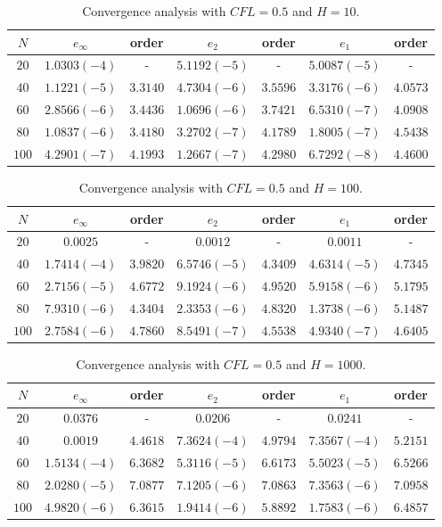 \documentclass[10pt,a4paper]{amsart}
\begin{document}
\begin{table}[H!]
\begin{tabular}{c|c|c|c|c|c|c}
$N$ & $e_{\infty}$ & order & $e_2$ & order & $e_1$ & order \\ 
\hline 
\hline
$20$ & $1.0303 (-4)$ & - & $5.1192 (-5)$ & - & $5.0087 (-5)$ & - \\ 
\hline 
$40$ & $1.1221 (-5)$ & $3.3140$ & $4.7304 (-6)$ & $3.5596$ & $3.3176 (-6)$ & $4.0573$ \\ 
\hline 
$60$ & $2.8566 (-6)$ & $3.4436$ & $1.0696 (-6)$ & $3.7421$ & $6.5310 (-7)$ & $4.0908$ \\
\hline 
$80$ & $1.0837 (-6)$ & $3.4180$ & $3.2702 (-7)$ & $4.1789$ & $1.8005 (-7)$ & $4.5438$ \\ 
\hline 
$100$ & $4.2901(-7)$ & $4.1993$ & $1.2667 (-7)$ & $4.2980$ & $6.7292 (-8)$ & $4.4600$  \\ 
\end{tabular} 
\caption{Convergence analysis with $CFL=0.5$ and $H=10$.}
\label{CV_order8_hp10}
\end{table}

\begin{table}[H!]
\begin{tabular}{c|c|c|c|c|c|c}
$N$ & $e_{\infty}$ & order & $e_2$ & order & $e_1$ & order \\ 
\hline 
\hline
$20$ & $0.0025$ & - & $0.0012$ & - & $0.0011$ & - \\ 
\hline 
$40$ & $1.7414 (-4)$ & $3.9820$ & $6.5746 (-5)$ & $4.3409$ & $4.6314 (-5)$ & $4.7345$ \\ 
\hline 
$60$ & $2.7156 (-5)$ & $4.6772$ & $9.1924 (-6)$ & $4.9520$ & $5.9158 (-6)$ & $5.1795$ \\
\hline 
$80$ & $7.9310 (-6)$ & $4.3404$ & $2.3353 (-6)$ & $4.8320$ & $1.3738 (-6)$ & $5.1487$ \\ 
\hline 
$100$ & $2.7584(-6)$ & $4.7860$ & $8.5491 (-7)$ & $4.5538$ & $4.9340 (-7)$ & $4.6405$  \\ 
\end{tabular} 
\caption{Convergence analysis with $CFL=0.5$ and $H=100$.}
\label{CV_order8_hp100}
\end{table}

\begin{table}[H!]
\begin{tabular}{c|c|c|c|c|c|c}
$N$ & $e_{\infty}$ & order & $e_2$ & order & $e_1$ & order \\ 
\hline 
\hline
$20$ & $0.0376$ & - & $0.0206$ & - & $0.0241$ & - \\ 
\hline 
$40$ & $0.0019$ & $4.4618$ & $7.3624 (-4)$ & $4.9794$ & $7.3567 (-4)$ & $5.2151$ \\ 
\hline 
$60$ & $1.5134 (-4)$ & $6.3682$ & $5.3116 (-5)$ & $6.6173$ & $5.5023 (-5)$ & $6.5266$ \\
\hline 
$80$ & $2.0280 (-5)$ & $7.0877$ & $7.1205 (-6)$ & $7.0863$ & $7.3563 (-6)$ & $7.0958$ \\ 
\hline 
$100$ & $4.9820(-6)$ & $6.3615$ & $1.9414 (-6)$ & $5.8892$ & $1.7583 (-6)$ & $6.4857$  \\ 
\end{tabular} 
\caption{Convergence analysis with $CFL=0.5$ and $H=1000$.}
\label{CV_order8_hp1000}
\end{table}
\end{document}

